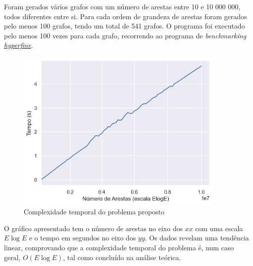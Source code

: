 \documentclass[12pt,a4paper]{article}
\begin{document}
  Foram gerados vários grafos com um número de arestas entre 10 e 10 000 000, todos diferentes entre si. Para cada ordem de grandeza de arestas foram gerados pelo menos 100 grafos, tendo um total de 541 grafos.
  O programa foi executado pelo menos 100 vezes para cada grafo, recorrendo ao programa de \textit{benchmarking} \href{https://github.com/sharkdp/hyperfine}{\textit{hyperfine}}.

  \begin{figure}[h]
    \centering
    \includegraphics[width=4in]{report.png}
    \caption{Complexidade temporal do problema proposto}
  \end{figure}

  O gráfico apresentado tem o número de arestas no eixo dos $xx$ com uma escala $E \log E$ e o tempo em segundos no eixo dos $yy$.
  Os dados revelam uma tendência linear, comprovando que a complexidade temporal do problema é, num caso geral, $O(E\log E)$, tal como concluído na análise teórica.

  \printbibliography[title={Referência}]
\end{document}
